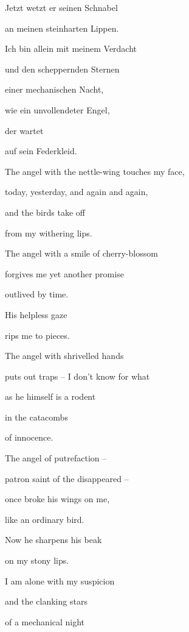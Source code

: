 \documentclass[a4paper]{article}
\begin{document}
\bigskip

Jetzt wetzt er seinen Schnabel

an meinen steinharten Lippen.


\bigskip

Ich bin allein mit meinem Verdacht

und den scheppernden Sternen

einer mechanischen Nacht, 

wie ein unvollendeter Engel,

der wartet

auf sein Federkleid. 



\bigskip

The angel with the nettle-wing touches my face,

today, yesterday, and again and again,

and the birds take off

from my withering lips.


\bigskip

The angel with a smile of cherry-blossom

forgives me yet another promise

outlived by time.

His helpless gaze

rips me to pieces.


\bigskip

The angel with shrivelled hands

puts out traps – I don't know for what 

as he himself is a rodent

in the catacombs

of innocence.


\bigskip

The angel of putrefaction – 

patron saint of the disappeared – 

once broke his wings on me,

like an ordinary bird.


\bigskip

Now he sharpens his beak

on my stony lips.


\bigskip

I am alone with my suspicion

and the clanking stars

of a mechanical night
\end{document}

